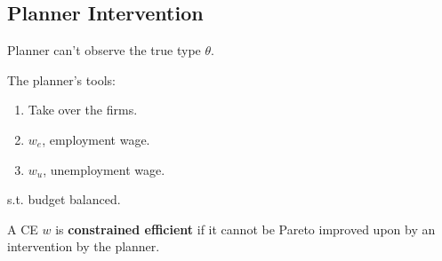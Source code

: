 \documentclass[11pt]{elegantbook}
\begin{document}
\subsection{Planner Intervention}
Planner can't observe the true type $\theta$.

The planner's tools:
\begin{enumerate}
    \item Take over the firms.
    \item $w_e$, employment wage.
    \item $w_u$, unemployment wage.
\end{enumerate}
s.t. budget balanced.

\begin{definition}
    \normalfont
    A CE $w$ is \textbf{constrained efficient} if it cannot be Pareto improved upon by an intervention by the planner.
\end{definition}
\end{document}
